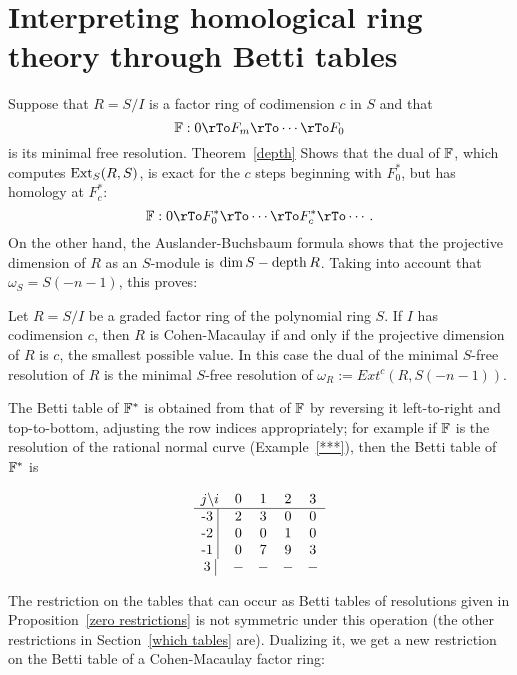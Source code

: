 \section{Interpreting homological ring theory through Betti tables}

Suppose that $R = S/I$ is a  factor ring of codimension $c$ in $S$ and that
$$
\FF: 0 \rTo F_{m} \rTo\cdots\rTo F_{0}
$$ 
is its minimal free resolution. Theorem~\ref{depth} %
Shows that the dual of ${\mathbb F}$, which computes ${\rm{Ext}}_{S}(R,S)$, is exact for the $c$ steps beginning
with $F_{0}^{*}$, but has homology at $F_{c}^{*}$:
$$
\FF: 0 \rTo F_{0}^{*} \rTo\cdots\rTo F_{c}^{*} \rTo\cdots.
$$ 
On the other hand, the Auslander-Buchsbaum formula shows that the projective dimension of $R$
as an $S$-module is $\dim S - \operatorname{depth} R$. Taking into account that $\omega_{S} = S(-n-1)$, this proves:
\begin{proposition}
 Let $R = S/I$ be a graded factor ring of the polynomial ring $S$. If $I$ has codimension $c$, then
 $R$ is Cohen-Macaulay if and only if the projective dimension of $R$ is $c$, the smallest possible value.
 In this case the dual of the minimal $S$-free resolution of $R$ is the minimal $S$-free resolution of
 $\omega_{R} := Ext^{c}(R,S(-n-1))$.
\end{proposition}

The Betti table of ${\mathbb F}^{*}$ is obtained from that of ${\mathbb F}$ by reversing it left-to-right and top-to-bottom, adjusting the row indices appropriately; for example if ${\mathbb F}$ is the resolution of the rational normal curve
(Example~\ref{***}), then the Betti table of ${\mathbb F}^{*}$ is 
\begin{small}
$$
\begin{matrix}
j \backslash i &0&1&2&3\\ \hline
\text{-3 }\vline &2&3&0&0\\
\text{-2 }\vline &0&0&1&0\\
\text{-1 }\vline &0&7&9&3\\
\text{3 }\vline &-&-&-&-\\
\end{matrix}
$$
\end{small}

The restriction on the tables that can occur as Betti tables of resolutions given in Proposition~\ref{zero restrictions} is not symmetric under this operation (the other restrictions in Section~\ref{which tables} are). Dualizing it, we get a new restriction on the Betti table of a Cohen-Macaulay factor ring:


